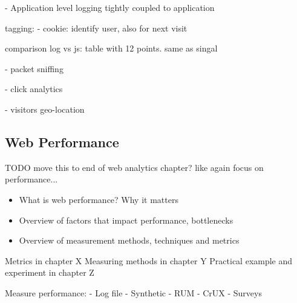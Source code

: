 - Application level logging
tightly coupled to application





tagging:
- cookie: identify user, also for next visit


comparison log vs js:
table with 12 points. same as singal




- packet sniffing

- click analytics

- visitors geo-location









\subsection{Web Performance}
TODO move this to end of web analytics chapter? like again focus on performance...
\begin{itemize}
\item What is web performance? Why it matters
\item Overview of factors that impact performance, bottlenecks
\item Overview of measurement methods, techniques and metrics
\end{itemize}


Metrics in chapter X
Measuring methods in chapter Y
Practical example and experiment in chapter Z









Measure performance:
- Log file
- Synthetic
- RUM
- CrUX
- Surveys




